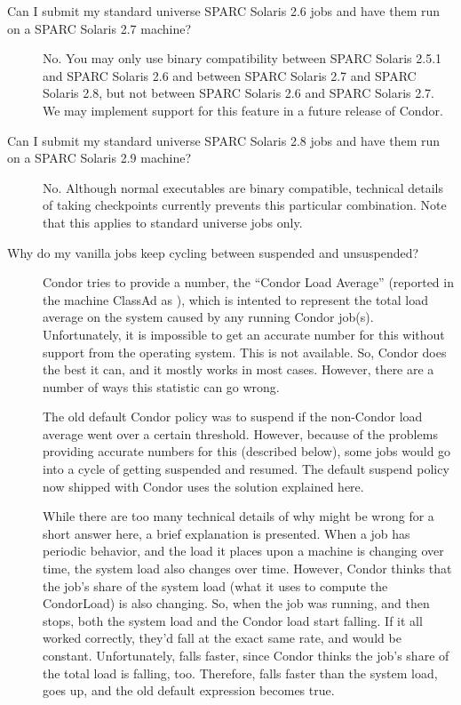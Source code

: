 \begin{description}
\begin{enumerate}
\end{enumerate}

\item[Can I submit my standard universe SPARC Solaris 2.6 jobs and have them run on a SPARC Solaris 2.7 machine?]

No. You may only use binary compatibility between SPARC Solaris 2.5.1
and SPARC Solaris 2.6 and between SPARC Solaris 2.7 and SPARC Solaris
2.8, but not between SPARC Solaris 2.6 and SPARC Solaris 2.7.  We may
implement support for this feature in a future release of Condor.

\item[Can I submit my standard universe SPARC Solaris 2.8 jobs and have
them run on a SPARC Solaris 2.9 machine?]

No.  Although normal executables are binary compatible, technical details
of taking checkpoints currently prevents this particular combination.
Note that this applies to standard universe jobs only.


\item[Why do my vanilla jobs keep cycling between suspended and unsuspended?]

Condor tries to provide a number, the ``Condor Load Average''
(reported in the machine ClassAd as ), which is
intented to represent the total load average on the system caused by
any running Condor job(s).
Unfortunately, it is impossible to get an accurate number for
this without support from the operating system.
This is not available.
So, Condor does the best it can, and it mostly works in most cases.
However, there are a number of ways this statistic can go wrong.

The old default Condor policy was to suspend if the non-Condor load
average went over a certain threshold.
However, because of the problems providing accurate numbers for this
(described below), some jobs would go into a cycle of getting
suspended and resumed.
The default suspend policy now shipped with Condor uses the
solution explained here.

While there are too many technical details of why
 might be wrong for a short answer here, a brief
explanation is presented.
When a job has periodic behavior, and the load it places upon
a machine is changing over time,
the system load also changes over time.  
However, Condor thinks that the job's share of the system load
(what it uses to compute the CondorLoad) is also changing.
So, when the job was running, and then stops, both the system load and
the Condor load start falling.
If it all worked correctly, they'd fall at the exact same rate, and
 would be constant.
Unfortunately,  falls faster, since Condor
thinks the job's share of the total load is falling, too.
Therefore,  falls faster than the system load,
 goes up, and the old default 
expression becomes true.


\end{description}
